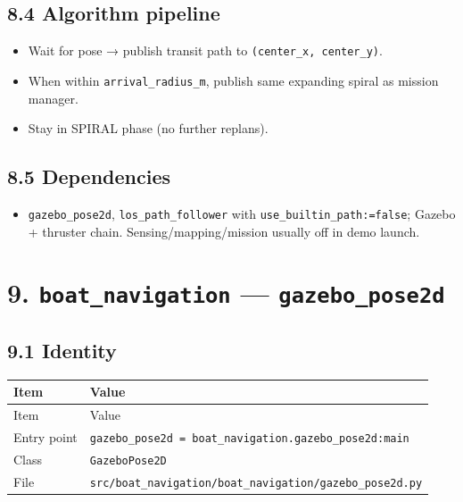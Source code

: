\subsection{8.4 Algorithm pipeline}


\begin{itemize}[leftmargin=*]
\item Wait for pose → publish transit path to \texttt{(center\_x, center\_y)}.
\item When within \texttt{arrival\_radius\_m}, publish same expanding spiral as mission manager.
\item Stay in SPIRAL phase (no further replans).
\end{itemize}


\subsection{8.5 Dependencies}


\begin{itemize}[leftmargin=*]
\item \texttt{gazebo\_pose2d}, \texttt{los\_path\_follower} with \texttt{use\_builtin\_path:=false}; Gazebo + thruster chain. Sensing/mapping/mission usually off in demo launch.
\end{itemize}




\section{9. \texttt{boat\_navigation} --- \texttt{gazebo\_pose2d}}


\subsection{9.1 Identity}


\begin{center}
\small
\begin{longtable}{@{}lp{10cm}@{}}
\toprule
Item & Value \\
\midrule
\endfirsthead
\toprule
Item & Value \\
\midrule
\endhead
Entry point & \texttt{gazebo\_pose2d = boat\_navigation.gazebo\_pose2d:main} \\
Class & \texttt{GazeboPose2D} \\
File & \texttt{src/boat\_navigation/boat\_navigation/gazebo\_pose2d.py} \\
\bottomrule
\end{longtable}
\end{center}


